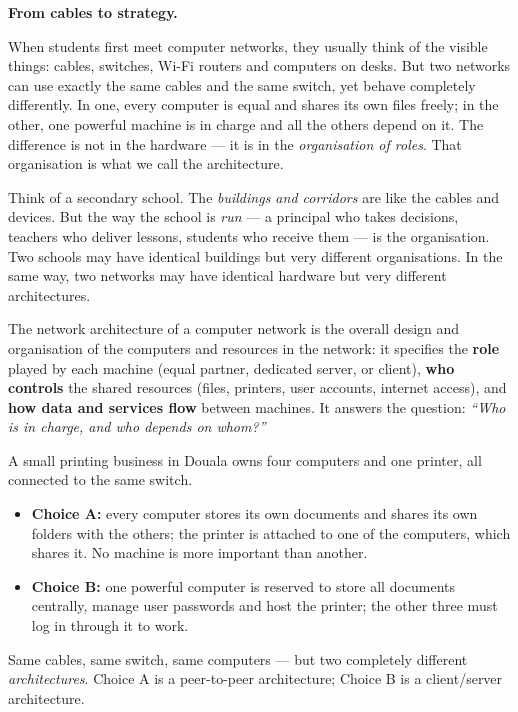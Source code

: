 \documentclass[11pt]{article}
\newcommand{\cle}[1]{{\popxbold\color{popdark}#1}}
\newcounter{popsec}
\newcounter{popsub}
\newcommand{\courssub}[1]{%
  \stepcounter{popsub}%
  \par\vspace{9pt}\noindent{\popxbold\fontsize{11.5}{13}\selectfont\color{popink}{\color{poporange}\thepopsec.\thepopsub}\hspace{6pt}#1}\par\nopagebreak\vspace{4pt}
}
\begin{document}
\courssub{What is Network Architecture?}

\textbf{From cables to strategy.}\par
When students first meet computer networks, they usually think of the visible things: cables, switches, Wi-Fi routers and computers on desks. But two networks can use exactly the same cables and the same switch, yet behave completely differently. In one, every computer is equal and shares its own files freely; in the other, one powerful machine is in charge and all the others depend on it. The difference is not in the hardware --- it is in the \emph{organisation of roles}. That organisation is what we call the architecture.

Think of a secondary school. The \emph{buildings and corridors} are like the cables and devices. But the way the school is \emph{run} --- a principal who takes decisions, teachers who deliver lessons, students who receive them --- is the organisation. Two schools may have identical buildings but very different organisations. In the same way, two networks may have identical hardware but very different architectures.

\begin{definition}
The \cle{network architecture} of a computer network is the overall design and organisation of the computers and resources in the network: it specifies the \textbf{role} played by each machine (equal partner, dedicated server, or client), \textbf{who controls} the shared resources (files, printers, user accounts, internet access), and \textbf{how data and services flow} between machines. It answers the question: \emph{``Who is in charge, and who depends on whom?''}
\end{definition}

\begin{exemplebox}
A small printing business in Douala owns four computers and one printer, all connected to the same switch.
\begin{itemize}
\item \textbf{Choice A:} every computer stores its own documents and shares its own folders with the others; the printer is attached to one of the computers, which shares it. No machine is more important than another.
\item \textbf{Choice B:} one powerful computer is reserved to store all documents centrally, manage user passwords and host the printer; the other three must log in through it to work.
\end{itemize}
Same cables, same switch, same computers --- but two completely different \emph{architectures}. Choice A is a \cle{peer-to-peer} architecture; Choice B is a \cle{client/server} architecture.
\end{exemplebox}
\end{document}
